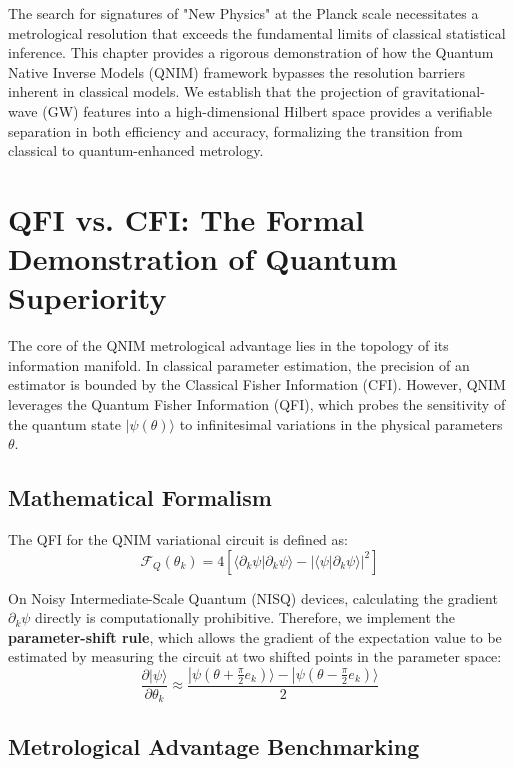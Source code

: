 \documentclass[11pt,a4paper,spanish]{book}
\numberwithin{equation}{chapter}
\numberwithin{figure}{chapter}
\numberwithin{equation}{chapter}
\numberwithin{figure}{chapter}
\numberwithin{table}{chapter}
\begin{document}
The search for signatures of "New Physics" at the Planck scale necessitates a metrological resolution that exceeds the fundamental limits of classical statistical inference. This chapter provides a rigorous demonstration of how the Quantum Native Inverse Models (QNIM) framework bypasses the resolution barriers inherent in classical models. We establish that the projection of gravitational-wave (GW) features into a high-dimensional Hilbert space provides a verifiable separation in both efficiency and accuracy, formalizing the transition from classical to quantum-enhanced metrology.

\section{QFI vs. CFI: The Formal Demonstration of Quantum Superiority}

The core of the QNIM metrological advantage lies in the topology of its information manifold. In classical parameter estimation, the precision of an estimator is bounded by the Classical Fisher Information (CFI). However, QNIM leverages the Quantum Fisher Information (QFI), which probes the sensitivity of the quantum state $|\psi(\theta)\rangle$ to infinitesimal variations in the physical parameters $\theta$.

\subsection{Mathematical Formalism}

The QFI for the QNIM variational circuit is defined as:
\begin{equation}
    \mathcal{F}_Q(\theta_k) = 4\left[ \langle \partial_k \psi | \partial_k \psi \rangle - |\langle \psi | \partial_k \psi \rangle|^2 \right]
\end{equation}

On Noisy Intermediate-Scale Quantum (NISQ) devices, calculating the gradient $\partial_k \psi$ directly is computationally prohibitive. Therefore, we implement the \textbf{parameter-shift rule}, which allows the gradient of the expectation value to be estimated by measuring the circuit at two shifted points in the parameter space:
\begin{equation}
    \frac{\partial |\psi\rangle}{\partial \theta_k} \approx \frac{|\psi(\theta + \frac{\pi}{2} e_k)\rangle - |\psi(\theta - \frac{\pi}{2} e_k)\rangle}{2}
\end{equation}

\subsection{Metrological Advantage Benchmarking}
\end{document}

